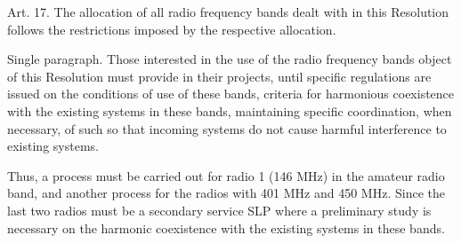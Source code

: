 Art. 17. The allocation of all radio frequency bands dealt with in this Resolution follows the restrictions imposed by the respective allocation.

Single paragraph. Those interested in the use of the radio frequency bands object of this Resolution must provide in their projects, until specific regulations are issued on the conditions of use of these bands, criteria for harmonious coexistence with the existing systems in these bands, maintaining specific coordination, when necessary, of such so that incoming systems do not cause harmful interference to existing systems.

Thus, a process must be carried out for radio 1 (146 MHz) in the amateur radio band, and another process for the radios with 401 MHz and 450 MHz. Since the last two radios must be a secondary service SLP where a preliminary study is necessary on the harmonic coexistence with the existing systems in these bands.
